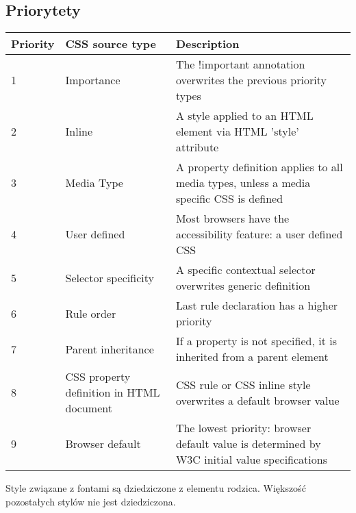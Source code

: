 \documentclass[../main.tex]{subfiles}
\begin{document}
    \subsection{Priorytety}
    \begin{table}[H]
        \begin{center}
            \begin{tabular}{|p{1.5cm}|p{4cm}|p{10.5cm}|}
                \hline
                \textbf{Priority} & \textbf{CSS source type} & \textbf{Description}\\
                \hline
                \hline
                1 & Importance & The !important annotation overwrites the previous priority types\\
                \hline
                2 & Inline & A style applied to an HTML element via HTML 'style' attribute\\
                \hline
                3 & Media Type & A property definition applies to all media types, unless a media specific CSS is defined\\
                \hline
                4 & User defined & Most browsers have the accessibility feature: a user defined CSS\\
                \hline
                5 & Selector specificity & A specific contextual selector overwrites generic definition\\
                \hline
                6 & Rule order & Last rule declaration has a higher priority\\
                \hline
                7 & Parent inheritance & If a property is not specified, it is inherited from a parent element\\
                \hline
                8 & CSS property definition in HTML document & CSS rule or CSS inline style overwrites a default browser value\\
                \hline
                9 & Browser default & The lowest priority: browser default value is determined by W3C initial value specifications\\
                \hline
            \end{tabular}
        \end{center}
    \end{table}
    Style związane z fontami są dziedziczone z elementu rodzica. Większość pozostałych stylów nie jest dziedziczona.
\end{document}
